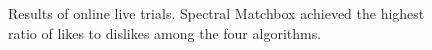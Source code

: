 \begin{figure}[h!]
\centering
{}
\caption{Results of online live trials. Spectral Matchbox achieved the highest ratio of likes to dislikes among the four algorithms.}
\label{fig:online2}
\end{figure}

